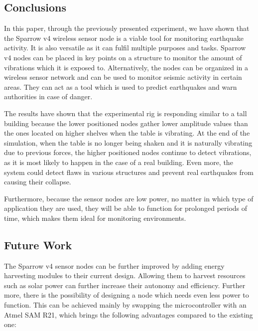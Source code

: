 \subsection{Conclusions}

In this paper, through the previously presented experiment, we have shown 
that the Sparrow v4 wireless sensor node is a viable tool for monitoring 
earthquake activity. It is also versatile as it can fulfil multiple purposes 
and tasks. Sparrow v4 nodes can be placed in key points on a structure to monitor 
the amount of vibrations which it is exposed to. Alternatively, the nodes can 
be organized in a wireless sensor network and can be used to monitor seismic activity 
in certain areas. They can act as a tool which is used to predict earthquakes and 
warn authorities in case of danger.

The results have shown that the experimental rig is responding similar to a tall building because 
the lower positioned nodes gather lower amplitude values than the ones located on higher shelves 
when the table is vibrating. At the end of the simulation, when the table is no longer being shaken 
and it is naturally vibrating due to previous forces, the higher positioned nodes continue 
to detect vibrations, as it is most likely to happen in the case of a real building. Even more, the 
system could detect flaws in various structures and prevent real earthquakes from causing their collapse.

Furthermore, because the sensor nodes are low power, no matter in which type of application they 
are used, they will be able to function for prolonged periods of time, which makes them ideal 
for monitoring environments.

\subsection{Future Work}
The Sparrow v4 sensor nodes can be further improved by adding energy harvesting modules to their 
current design. Allowing them to harvest resources such as solar power can further increase 
their autonomy and efficiency. Further more, there is the possibility of designing a node which needs even less power to function. 
This can be achieved mainly by swapping the microcontroller with an Atmel SAM R21, which brings the following advantages compared to the existing one:

